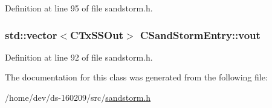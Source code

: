 Definition at line 95 of file sandstorm.\+h.

\hypertarget{class_c_sand_storm_entry_a116f3b2ccbbd5958421dfdcce6a4f9c5}{}
\subsubsection[{vout}]{\setlength{\rightskip}{0pt plus 5cm}std\+::vector$<${\bf C\+Tx\+S\+S\+Out}$>$ C\+Sand\+Storm\+Entry\+::vout}\label{class_c_sand_storm_entry_a116f3b2ccbbd5958421dfdcce6a4f9c5}


Definition at line 92 of file sandstorm.\+h.



The documentation for this class was generated from the following file\+:\begin{DoxyCompactItemize}
\item 
/home/dev/ds-\/160209/src/\hyperlink{sandstorm_8h}{sandstorm.\+h}\end{DoxyCompactItemize}
